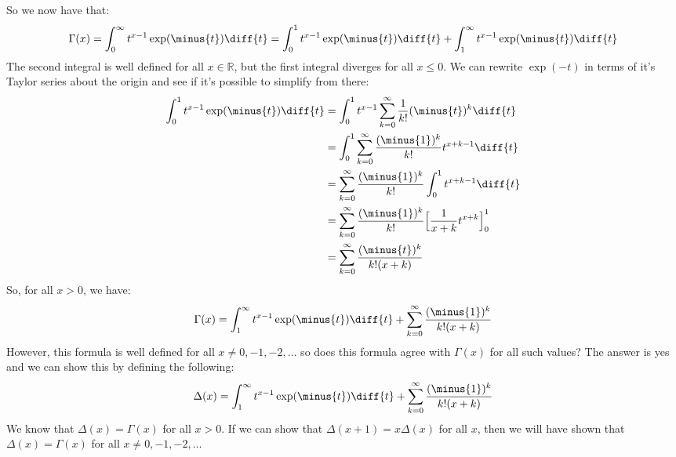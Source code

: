         So we now have that:
        \begin{equation}
            \Gamma(x)=
            \int_{0}^{\infty}t^{x-1}\exp(\minus{t})\diff{t}
            =\int_{0}^{1}t^{x-1}\exp(\minus{t})\diff{t}+
            \int_{1}^{\infty}t^{x-1}\exp(\minus{t})\diff{t}
        \end{equation}
        The second integral is well defined for all $x\in\mathbb{R}$,
        but the first integral diverges for all $x\leq{0}$.
        We can rewrite $\exp(\minus{t})$ in terms of it's
        Taylor series about the origin and see if it's possible to
        simplify from there:
        \begin{align}
            \int_{0}^{1}t^{x-1}\exp(\minus{t})\diff{t}
            &=\int_{0}^{1}t^{x-1}
            \sum_{k=0}^{\infty}
                \frac{1}{k!}(\minus{t})^{k}\diff{t}\\
            &=\int_{0}^{1}\sum_{k=0}^{\infty}
            \frac{(\minus{1})^{k}}{k!}t^{x+k-1}\diff{t}\\
            &=\sum_{k=0}^{\infty}\frac{(\minus{1})^{k}}{k!}
            \int_{0}^{1}t^{x+k-1}\diff{t}\\
            &=\sum_{k=0}^{\infty}\frac{(\minus{1})^{k}}{k!}
                \Big[\frac{1}{x+k}t^{x+k}\Big]_{0}^{1}\\
            &=\sum_{k=0}^{\infty}\frac{(\minus{t})^{k}}{k!(x+k)}
        \end{align}
        So, for all $x>0$, we have:
        \begin{equation}
            \Gamma(x)=
            \int_{1}^{\infty}t^{x-1}\exp(\minus{t})\diff{t}+
            \sum_{k=0}^{\infty}\frac{(\minus{1})^{k}}{k!(x+k)}
        \end{equation}
        However, this formula is well defined for all
        $x\ne{0},\minus{1},\minus{2},\dots$ so does this formula
        agree with $\Gamma(x)$ for all such values? The answer is
        yes and we can show this by defining the following:
        \begin{equation}
            \Delta(x)=
            \int_{1}^{\infty}t^{x-1}\exp(\minus{t})\diff{t}+
            \sum_{k=0}^{\infty}\frac{(\minus{1})^{k}}{k!(x+k)}
        \end{equation}
        We know that $\Delta(x)=\Gamma(x)$ for all
        $x>0$. If we can show that $\Delta(x+1)=x\Delta(x)$ for
        all $x$, then we will have shown that $\Delta(x)=\Gamma(x)$
        for all $x\ne{0},\minus{1},\minus{2},\dots$
